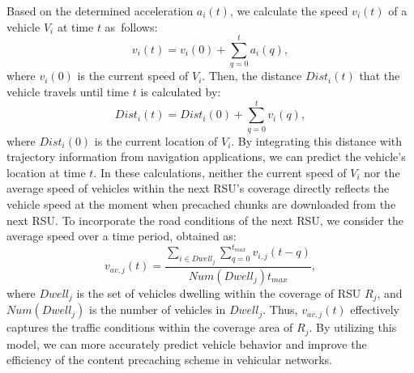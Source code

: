 \documentclass{aims}
\numberwithin{equation}{section}
\begin{document}
Based on the determined acceleration $a_{i}(t)$, we calculate the speed $v_{i}(t)$ of a vehicle $V_{i}$ at time $t$ as~follows:
\begin{equation}
    v_{i}(t) = v_{i}(0) + \sum_{q=0}^{t} a_{i}(q),
\end{equation}
where $v_{i}(0)$ is the current speed of $V_{i}$.
Then, the distance $Dist_{i}(t)$ that the vehicle travels until time $t$ is calculated by:
\begin{equation}
    Dist_{i}(t) = Dist_{i}(0) + \sum_{q=0}^{t} v_{i}(q),
\end{equation}
where $Dist_{i}(0)$ is the current location of $V_{i}$.
By integrating this distance with trajectory information from navigation applications, we can predict the vehicle's location at time $t$.
In these calculations, neither the current speed of $V_{i}$ nor the average speed of vehicles within the next RSU's coverage directly reflects the vehicle speed at the moment when precached chunks are downloaded from the next RSU.
To incorporate the road conditions of the next RSU, we consider the average speed over a time period, obtained as:
\begin{equation}
    v_{av, j}(t) = \frac{\sum_{i\in Dwell_{j}}\sum_{q=0}^{t_{max}}v_{i, j}(t-q)}{Num(Dwell_{j})t_{max}},
\end{equation}
where $Dwell_{j}$ is the set of vehicles dwelling within the coverage of RSU $R_{j}$, and $Num(Dwell_{j})$ is the number of vehicles in $Dwell_{j}$.
Thus, $v_{av,j}(t)$ effectively captures the traffic conditions within the coverage area of $R_{j}$.
By utilizing this model, we can more accurately predict vehicle behavior and improve the efficiency of the content precaching scheme in vehicular networks.
\end{document}
